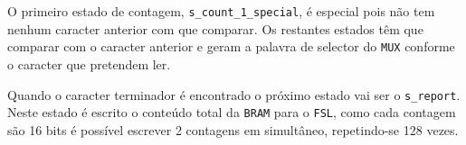   O primeiro estado de contagem, \texttt{s\_count\_1\_special}, é especial pois não tem nenhum caracter anterior com que comparar. Os restantes estados têm que comparar com o caracter anterior e geram a palavra de selector do \texttt{MUX} conforme o caracter que pretendem ler.

  Quando o caracter terminador é encontrado o próximo estado vai ser o \texttt{s\_report}. Neste estado é escrito o conteúdo total da \texttt{BRAM} para o \texttt{FSL}, como cada contagem são 16 bits é possível escrever 2 contagens em simultâneo, repetindo-se 128 vezes.
